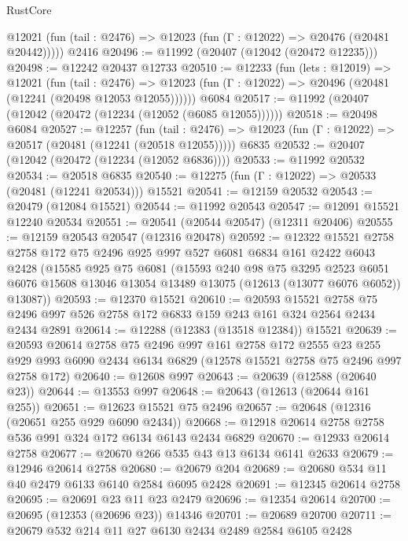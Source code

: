 \begin{lexlean}{RustCore}
\begin{coremodule}
      @12021 (fun (tail : @2476) => @12023 (fun (Γ : @12022) => @20476 (@20481 @20442)))))
    @2416
@20496 := @11992 (@20407 (@12042 (@20472 @12235)))
@20498 := @12242 @20437 @12733
@20510 := @12233
    (fun (lets : @12019) =>
    @12021
      (fun (tail : @2476) =>
      @12023 (fun (Γ : @12022) => @20496 (@20481 (@12241 (@20498 @12053 @12055))))))
    @6084
@20517 := @11992 (@20407 (@12042 (@20472 (@12234 (@12052 (@6085 @12055))))))
@20518 := @20498 @6084
@20527 := @12257
    (fun (tail : @2476) => @12023 (fun (Γ : @12022) => @20517 (@20481 (@12241 (@20518 @12055)))))
    @6835
@20532 := @20407 (@12042 (@20472 (@12234 (@12052 @6836))))
@20533 := @11992 @20532
@20534 := @20518 @6835
@20540 := @12275 (fun (Γ : @12022) => @20533 (@20481 (@12241 @20534))) @15521
@20541 := @12159 @20532
@20543 := @20479 (@12084 @15521)
@20544 := @11992 @20543
@20547 := @12091 @15521 @12240 @20534
@20551 := @20541 (@20544 @20547) (@12311 @20406)
@20555 := @12159 @20543 @20547 (@12316 @20478)
@20592 := @12322
    @15521
    @2758
    @2758
    @172
    @75
    @2496
    @925
    @997
    @527
    @6081
    @6834
    @161
    @2422
    @6043
    @2428
    (@15585
      @925
      @75
      @6081
      (@15593
        @240
        @98
        @75
        @3295
        @2523
        @6051
        @6076
        @15608
        @13046
        @13054
        @13489
        @13075
        (@12613 (@13077 @6076 @6052))
        @13087))
@20593 := @12370 @15521
@20610 := @20593
    @15521
    @2758
    @75
    @2496
    @997
    @526
    @2758
    @172
    @6833
    @159
    @243
    @161
    @324
    @2564
    @2434
    @2434
    @2891
@20614 := @12288 (@12383 (@13518 @12384)) @15521
@20639 := @20593
    @20614
    @2758
    @75
    @2496
    @997
    @161
    @2758
    @172
    @2555
    @23
    @255
    @929
    @993
    @6090
    @2434
    @6134
    @6829
    (@12578 @15521 @2758 @75 @2496 @997 @2758 @172)
@20640 := @12608 @997
@20643 := @20639 (@12588 (@20640 @23))
@20644 := @13553 @997
@20648 := @20643 (@12613 (@20644 @161 @255))
@20651 := @12623 @15521 @75 @2496
@20657 := @20648 (@12316 (@20651 @255 @929 @6090 @2434))
@20668 := @12918 @20614 @2758 @2758 @536 @991 @324 @172 @6134 @6143 @2434 @6829
@20670 := @12933 @20614 @2758
@20677 := @20670 @266 @535 @43 @13 @6134 @6141 @2633
@20679 := @12946 @20614 @2758
@20680 := @20679 @204
@20689 := @20680 @534 @11 @40 @2479 @6133 @6140 @2584 @6095 @2428
@20691 := @12345 @20614 @2758
@20695 := @20691 @23 @11 @23 @2479
@20696 := @12354 @20614
@20700 := @20695 (@12353 (@20696 @23)) @14346
@20701 := @20689 @20700
@20711 := @20679 @532 @214 @11 @27 @6130 @2434 @2489 @2584 @6105 @2428

\end{coremodule}
\end{lexlean}
